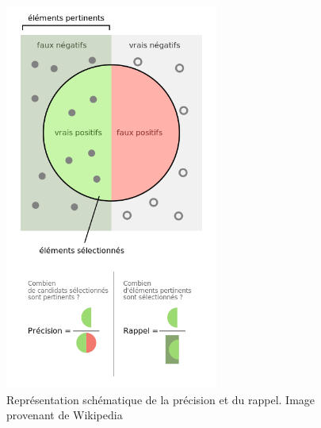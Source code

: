\begin{figure}[h]
  \centering
  \includegraphics[width=7cm]{./Chapitre3/figures/precisionRappel.png}
  \caption{Représentation schématique de la précision et du rappel. Image provenant de Wikipedia}
  \label{fig:precisionRappel}
\end{figure}
